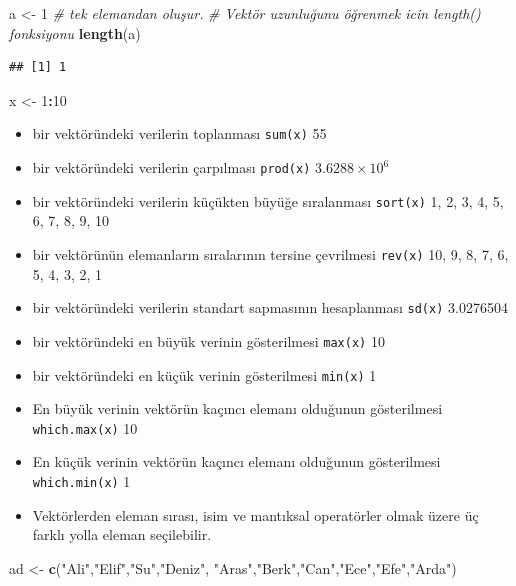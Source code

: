 \documentclass[
  oneside]{book}
\newenvironment{Shaded}{\begin{snugshade}}{\end{snugshade}}
\newcommand{\CommentTok}[1]{\textcolor[rgb]{0.56,0.35,0.01}{\textit{#1}}}
\newcommand{\DecValTok}[1]{\textcolor[rgb]{0.00,0.00,0.81}{#1}}
\newcommand{\FunctionTok}[1]{\textcolor[rgb]{0.13,0.29,0.53}{\textbf{#1}}}
\newcommand{\NormalTok}[1]{#1}
\newcommand{\OtherTok}[1]{\textcolor[rgb]{0.56,0.35,0.01}{#1}}
\newcommand{\SpecialCharTok}[1]{\textcolor[rgb]{0.81,0.36,0.00}{\textbf{#1}}}
\newcommand{\StringTok}[1]{\textcolor[rgb]{0.31,0.60,0.02}{#1}}
\begin{document}
\begin{Shaded}
\begin{Highlighting}[]
\NormalTok{a }\OtherTok{\textless{}{-}} \DecValTok{1}  \CommentTok{\# tek elemandan oluşur.}
\CommentTok{\# Vektör uzunluğunu öğrenmek icin length() fonksiyonu}
\FunctionTok{length}\NormalTok{(a)}
\end{Highlighting}
\end{Shaded}

\begin{verbatim}
## [1] 1
\end{verbatim}

\begin{Shaded}
\begin{Highlighting}[]
\NormalTok{x }\OtherTok{\textless{}{-}} \DecValTok{1}\SpecialCharTok{:}\DecValTok{10}
\end{Highlighting}
\end{Shaded}

\begin{itemize}
\item
  bir vektöründeki verilerin toplanması \texttt{sum(x)} 55
\item
  bir vektöründeki verilerin çarpılması \texttt{prod(x)} \ensuremath{3.6288\times 10^{6}}
\item
  bir vektöründeki verilerin küçükten büyüğe sıralanması \texttt{sort(x)} 1, 2, 3, 4, 5, 6, 7, 8, 9, 10
\item
  bir vektörünün elemanların sıralarının tersine çevrilmesi \texttt{rev(x)} 10, 9, 8, 7, 6, 5, 4, 3, 2, 1
\item
  bir vektöründeki verilerin standart sapmasının hesaplanması \texttt{sd(x)} 3.0276504
\item
  bir vektöründeki en büyük verinin gösterilmesi \texttt{max(x)} 10
\item
  bir vektöründeki en küçük verinin gösterilmesi \texttt{min(x)} 1
\item
  En büyük verinin vektörün kaçıncı elemanı olduğunun gösterilmesi \texttt{which.max(x)} 10
\item
  En küçük verinin vektörün kaçıncı elemanı olduğunun gösterilmesi \texttt{which.min(x)} 1
\item
  Vektörlerden eleman sırası, isim ve mantıksal operatörler olmak üzere üç farklı yolla eleman seçilebilir.
\end{itemize}

\begin{Shaded}
\begin{Highlighting}[]
\NormalTok{ad  }\OtherTok{\textless{}{-}}  \FunctionTok{c}\NormalTok{(}\StringTok{"Ali"}\NormalTok{,}\StringTok{"Elif"}\NormalTok{,}\StringTok{"Su"}\NormalTok{,}\StringTok{"Deniz"}\NormalTok{,}
\StringTok{"Aras"}\NormalTok{,}\StringTok{"Berk"}\NormalTok{,}\StringTok{"Can"}\NormalTok{,}\StringTok{"Ece"}\NormalTok{,}\StringTok{"Efe"}\NormalTok{,}\StringTok{"Arda"}\NormalTok{)}
\end{Highlighting}
\end{Shaded}
\end{document}
